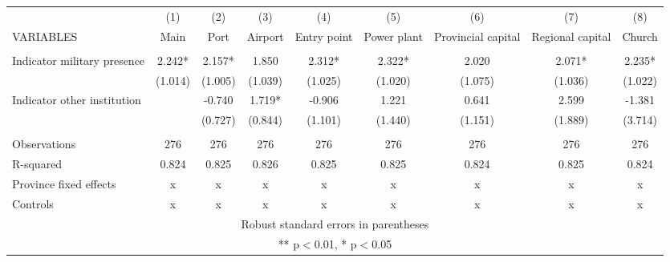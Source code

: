 \begin{tabular}{lcccccccc} \hline
 & (1) & (2) & (3) & (4) & (5) & (6) & (7) & (8) \\
VARIABLES & Main & Port & Airport & Entry point & Power plant & Provincial capital & Regional capital & Church \\ \hline
 &  &  &  &  &  &  &  &  \\
Indicator military presence & 2.242* & 2.157* & 1.850 & 2.312* & 2.322* & 2.020 & 2.071* & 2.235* \\
 & (1.014) & (1.005) & (1.039) & (1.025) & (1.020) & (1.075) & (1.036) & (1.022) \\
Indicator other institution &  & -0.740 & 1.719* & -0.906 & 1.221 & 0.641 & 2.599 & -1.381 \\
 &  & (0.727) & (0.844) & (1.101) & (1.440) & (1.151) & (1.889) & (3.714) \\
 &  &  &  &  &  &  &  &  \\
Observations & 276 & 276 & 276 & 276 & 276 & 276 & 276 & 276 \\
R-squared & 0.824 & 0.825 & 0.826 & 0.825 & 0.825 & 0.824 & 0.825 & 0.824 \\
Province fixed effects & x & x & x & x & x & x & x & x \\
 Controls & x & x & x & x & x & x & x & x \\ \hline
\multicolumn{9}{c}{ Robust standard errors in parentheses} \\
\multicolumn{9}{c}{ ** p$<$0.01, * p$<$0.05} \\
\end{tabular}
